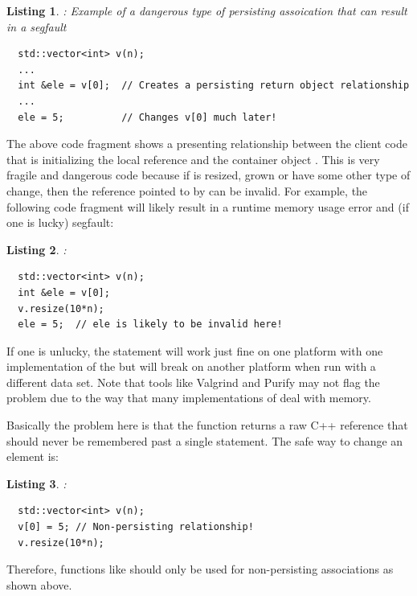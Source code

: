 \documentclass[pdf,ps2pdf,11pt]{SANDreport}
\newtheorem{listing}{Listing}
\begin{document}
{}\begin{listing}: Example of a dangerous type of persisting
assoication that can result in a segfault
\label{listing:bad-perist-example}
{\small\begin{verbatim}
  std::vector<int> v(n);
  ...
  int &ele = v[0];  // Creates a persisting return object relationship
  ...
  ele = 5;          // Changes v[0] much later!
\end{verbatim}}
\end{listing}


The above code fragment shows a presenting relationship between the client
code that is initializing the local reference {} and the
{} container object {}.  This is very fragile and
dangerous code because if {} is resized, grown or have some other type
of change, then the reference pointed to by {} can be invalid.  For
example, the following code fragment will likely result in a runtime memory
usage error and (if one is lucky) segfault:

\begin{listing}:\\
{\small\begin{verbatim}
  std::vector<int> v(n);
  int &ele = v[0];
  v.resize(10*n);
  ele = 5;  // ele is likely to be invalid here!
\end{verbatim}}
\end{listing}

If one is unlucky, the statement {} will work just fine on one
platform with one implementation of the {} but will break on
another platform when run with a different data set.  Note that tools like
Valgrind and Purify may not flag the problem due to the way that many
implementations of {} deal with memory.

Basically the problem here is that the
{} function returns a raw
C++ reference that should never be remembered past a single statement.
The safe way to change an element is:

\begin{listing}:\\
{\small\begin{verbatim}
  std::vector<int> v(n);
  v[0] = 5; // Non-persisting relationship!
  v.resize(10*n);
\end{verbatim}}
\end{listing}

Therefore, functions like {} should
only be used for non-persisting associations as shown above.
\end{document}
